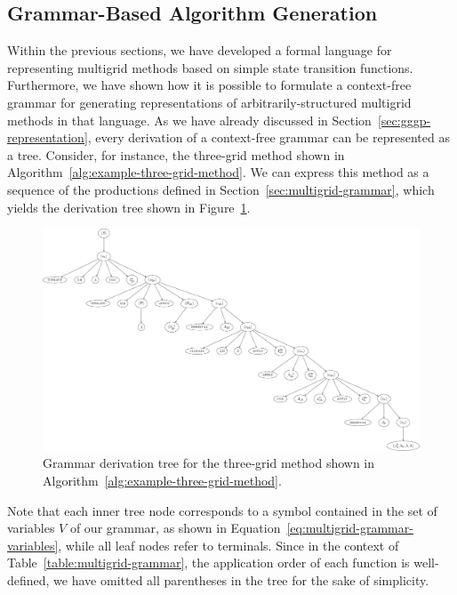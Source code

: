 \subsection{Grammar-Based Algorithm Generation}
\label{sec:grammar-based-algorithm-generation}
Within the previous sections, we have developed a formal language for representing multigrid methods based on simple state transition functions.
Furthermore, we have shown how it is possible to formulate a context-free grammar for generating representations of arbitrarily-structured multigrid methods in that language.
As we have already discussed in Section~\ref{sec:gggp-representation}, every derivation of a context-free grammar can be represented as a tree.
Consider, for instance, the three-grid method shown in Algorithm~\ref{alg:example-three-grid-method}.
We can express this method as a sequence of the productions defined in Section~\ref{sec:multigrid-grammar}, which yields the derivation tree shown in Figure~\ref{fig:example-three-grid-method-derivation-tree}.
\begin{figure}
	\centering
	\includegraphics[width=\textwidth]{figures/trees/three_grid_method_grammar_tree.pdf}
	\caption{Grammar derivation tree for the three-grid method shown in Algorithm~\ref{alg:example-three-grid-method}.}
	\label{fig:example-three-grid-method-derivation-tree}
\end{figure}
Note that each inner tree node corresponds to a symbol contained in the set of variables $V$ of our grammar, as shown in Equation~\eqref{eq:multigrid-grammar-variables}, while all leaf nodes refer to terminals.
Since in the context of Table~\ref{table:multigrid-grammar}, the application order of each function is well-defined, we have omitted all parentheses in the tree for the sake of simplicity.

